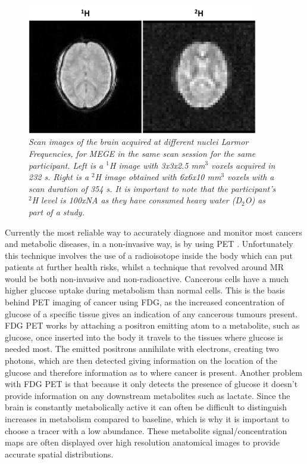 \begin{figure}[ht]
    \centering
    \includegraphics[width=0.9\textwidth]{Figures/Intro/1H2H_Brain.png}
    \caption{\textit{Scan images of the brain acquired at different nuclei Larmor Frequencies, for \ac{MEGE} in the same scan session for the same participant. Left is a $^1$H image with 3x3x2.5 mm$^3$ voxels acquired in 232 s. Right is a $^2$H image obtained with 6x6x10 mm$^3$ voxels with a scan duration of 354 s. It is important to note that the participant's $^2$H level is 100x\ac{NA} as they have consumed heavy water (D$_2$O) as part of a study.}}
    \label{fig:intro:1H2H_Brain}
\end{figure}

Currently the most reliable way to accurately diagnose and monitor most cancers and metabolic diseases, in a non-invasive way, is by using \ac{PET} \cite{Almuhaideb201118F-FDGOncology}. Unfortunately this technique involves the use of a radioisotope inside the body which can put patients at further health risks, whilst a technique that revolved around MR would be both non-invasive and non-radioactive. Cancerous cells have a much higher glucose uptake during metabolism than normal cells. This is the basis behind PET imaging of cancer using \ac{FDG}, as the increased concentration of glucose of a specific tissue gives an indication of any cancerous tumours present. \ac{FDG} \ac{PET} works by attaching a positron emitting atom to a metabolite, such as glucose, once inserted into the body it travels to the tissues where glucose is needed most. The emitted positrons annihilate with electrons, creating two photons, which are then detected giving information on the location of the glucose and therefore information as to where cancer is present. Another problem with \ac{FDG} \ac{PET} is that because it only detects the presence of glucose it doesn't provide information on any downstream metabolites such as lactate. Since the brain is constantly metabolically active it can often be difficult to distinguish increases in metabolism compared to baseline, which is why it is important to choose a tracer with a low abundance. These metabolite signal/concentration maps are often displayed over high resolution anatomical images to provide accurate spatial distributions.

